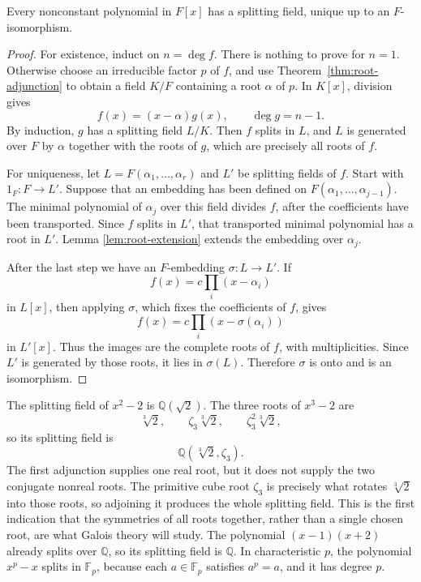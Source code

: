 \begin{theorem}\label{thm:splitting-existence}
Every nonconstant polynomial in \(F[x]\) has a splitting field, unique up to
an \(F\)-isomorphism.
\end{theorem}
\begin{proof}
For existence, induct on \(n=\deg f\).  There is nothing to prove for
\(n=1\).  Otherwise choose an irreducible factor \(p\) of \(f\), and use
Theorem~\ref{thm:root-adjunction} to obtain a field \(K/F\) containing a root
\(\alpha\) of \(p\).  In \(K[x]\), division gives
\[
f(x)=(x-\alpha)g(x),
\qquad
\deg g=n-1.
\]
By induction, \(g\) has a splitting field \(L/K\).  Then \(f\) splits in
\(L\), and \(L\) is generated over \(F\) by \(\alpha\) together with the
roots of \(g\), which are precisely all roots of \(f\).

For uniqueness, let \(L=F(\alpha_1,\ldots,\alpha_r)\) and \(L'\) be
splitting fields of \(f\).  Start with \(1_F:F\to L'\).  Suppose that an
embedding has been defined on \(F(\alpha_1,\ldots,\alpha_{j-1})\).  The
minimal polynomial of \(\alpha_j\) over this field divides \(f\), after the
coefficients have been transported.  Since \(f\) splits in \(L'\), that
transported minimal polynomial has a root in \(L'\).  Lemma
\ref{lem:root-extension} extends the embedding over \(\alpha_j\).

After the last step we have an \(F\)-embedding \(\sigma:L\to L'\).  If
\[
f(x)=c\prod_i(x-\alpha_i)
\]
in \(L[x]\), then applying \(\sigma\), which fixes the coefficients of
\(f\), gives
\[
f(x)=c\prod_i(x-\sigma(\alpha_i))
\]
in \(L'[x]\).  Thus the images are the complete roots of \(f\), with
multiplicities.  Since \(L'\) is generated by those roots, it lies in
\(\sigma(L)\).  Therefore \(\sigma\) is onto and is an isomorphism.
\end{proof}

\begin{example}
The splitting field of \(x^2-2\) is \(\mathbb Q(\sqrt2)\).  The three roots
of \(x^3-2\) are
\[
\sqrt[3]2,\qquad\zeta_3\sqrt[3]2,\qquad\zeta_3^2\sqrt[3]2,
\]
so its splitting field is
\[
\mathbb Q(\sqrt[3]2,\zeta_3).
\]
The first adjunction supplies one real root, but it does not supply the two
conjugate nonreal roots.  The primitive cube root \(\zeta_3\) is precisely
what rotates \(\sqrt[3]2\) into those roots, so adjoining it produces the
whole splitting field.  This is the first indication that the symmetries of
all roots together, rather than a single chosen root, are what Galois theory
will study.  The polynomial \((x-1)(x+2)\) already splits over
\(\mathbb Q\), so its splitting field is \(\mathbb Q\).  In characteristic
\(p\), the polynomial \(x^p-x\) splits in \(\mathbb F_p\), because each
\(a\in\mathbb F_p\) satisfies \(a^p=a\), and it has degree \(p\).
\end{example}

